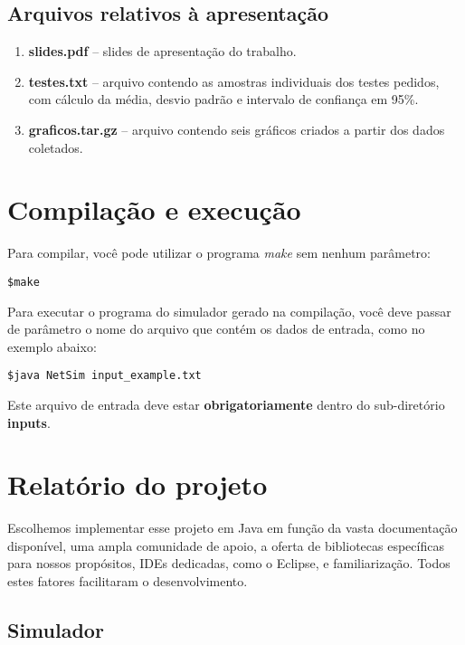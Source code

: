 \documentclass[11pt]{article}
\begin{document}
\subsection{Arquivos relativos à apresentação}
\begin{enumerate}
	\item \textbf{slides.pdf} -- slides de apresentação do trabalho.
	\item \textbf{testes.txt} -- arquivo contendo as amostras individuais dos testes pedidos, com cálculo da média, desvio padrão e intervalo de confiança em 95\%.
	\item \textbf{graficos.tar.gz} -- arquivo contendo seis gráficos criados a partir dos dados coletados.\\
\end{enumerate}

\section{Compilação e execução}
Para compilar, você pode utilizar o programa \textit{make} sem nenhum parâmetro:

\color{cyan}
\begin{verbatim}
$make
\end{verbatim}
\color{black}

\noindent Para executar o programa do simulador gerado na compilação, você deve passar de parâmetro o nome do arquivo que contém os dados de entrada, como no exemplo abaixo: 

\color{cyan}
\begin{verbatim}
$java NetSim input_example.txt
\end{verbatim}
\color{black}

\noindent Este arquivo de entrada deve estar \textbf{\textcolor{warning}{obrigatoriamente}} dentro do sub-diretório \textbf{inputs}. 

\section{Relatório do projeto}

Escolhemos implementar esse projeto em Java em função da vasta documentação disponível, uma ampla comunidade de apoio, a oferta de bibliotecas específicas para nossos propósitos, IDEs dedicadas, como o Eclipse, e familiarização. Todos estes fatores facilitaram o desenvolvimento.   

\subsection{Simulador}
\end{document}
